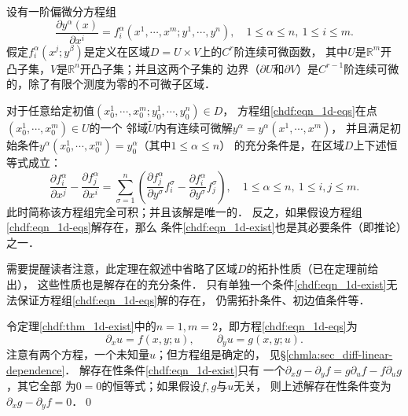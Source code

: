 设有一阶偏微分方程组
\begin{equation}\label{chdf:eqn_1d-eqs}
    \frac{\partial y^\alpha(x)}{\partial x^i} = f_i^\alpha (x^1,\cdots, x^m;y^1,\cdots,y^n),
    \quad 1 \leqslant \alpha \leqslant n, \ 1 \leqslant i \leqslant m .
\end{equation}
假定$f_i ^\alpha (x^j; y^\beta)$是定义在区域$D=U \times V $上的$C^r$阶连续可微函数，
其中$U$是$\mathbb{R}^m$开凸子集，$V$是$\mathbb{R}^n$开凸子集；并且这两个子集的
边界（$\partial U$和$\partial  V$）是$C^{r-1}$阶连续可微的，除了有限个测度为零的不可微子区域．
\begin{theorem}\label{chdf:thm_1d-exist}
    对于任意给定初值$(x^1_0,\cdots, x^m _0;y^1_0,\cdots,y^n_0)\in D$，
    方程组\eqref{chdf:eqn_1d-eqs}在点$(x^1_0,\cdots, x^m _0)\in U$的一个
    邻域$\tilde{U}$内有连续可微解$y^\alpha=y^\alpha(x^1,\cdots, x^m)$，
    并且满足初始条件$y^\alpha(x^1_0,\cdots, x^m _0)=y^\alpha_0$（其中$ 1 \leqslant \alpha \leqslant n$）
    的充分条件是，在区域$D$上下述恒等式成立：
    \begin{equation}\label{chdf:eqn_1d-exist}
        \frac{\partial f_i^\alpha}{\partial x^j} - \frac{\partial f^\alpha_j}{\partial x^i}
        = \sum_{\sigma=1}^{n} \left(\frac{\partial f^\alpha_j}{\partial y^\sigma} f^\sigma_i
          - \frac{\partial f_i^\alpha}{\partial y^\sigma} f^\sigma_j \right),
        \quad  1 \leqslant \alpha \leqslant n, \ 1 \leqslant i,j \leqslant m.
    \end{equation}
    此时简称该方程组完全可积；并且该解是唯一的．
    反之，如果假设方程组\eqref{chdf:eqn_1d-eqs}解存在，那么
    条件\eqref{chdf:eqn_1d-exist}也是其必要条件（即推论）之一．
\end{theorem}
需要提醒读者注意，此定理在叙述中省略了区域$D$的拓扑性质（已在定理前给出），
这些性质也是解存在的充分条件．
只有单独一个条件\eqref{chdf:eqn_1d-exist}无法保证方程组\eqref{chdf:eqn_1d-eqs}解的存在，
仍需拓扑条件、初边值条件等．

\begin{example}\label{chdf:exm_Fij2d}
    令定理\ref{chdf:thm_1d-exist}中的$n=1,m=2$，即方程\eqref{chdf:eqn_1d-eqs}为
    \begin{equation}
        \partial_x u = f(x,y;u),\qquad \partial_y u=g(x,y;u).
    \end{equation}
    注意有两个方程，一个未知量$u$；但方程组是确定的，
    见\S \ref{chmla:sec_diff-linear-dependence}．
    解存在性条件\eqref{chdf:eqn_1d-exist}只有
    一个$\partial_x g -\partial_y f = g \partial_u f-f \partial_u g $，其它全部
    为$0=0$的恒等式；如果假设$f,g$与$u$无关，
    则上述解存在性条件变为$\partial_x g -\partial_y f =0$．\qed
\end{example}

